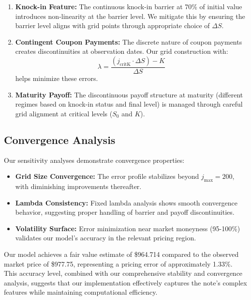 \documentclass[12pt,a4paper]{article}
\begin{document}
\begin{enumerate}
\item \textbf{Knock-in Feature:} The continuous knock-in barrier at 70\% of initial value introduces non-linearity at the barrier level. We mitigate this by ensuring the barrier level aligns with grid points through appropriate choice of \(\Delta S\).

\item \textbf{Contingent Coupon Payments:} The discrete nature of coupon payments creates discontinuities at observation dates. Our grid construction with:
\[
    \lambda = \frac{(j_{\text{critK}}\cdot \Delta S) - K}{\Delta S}
\]
helps minimize these errors.

\item \textbf{Maturity Payoff:} The discontinuous payoff structure at maturity (different regimes based on knock-in status and final level) is managed through careful grid alignment at critical levels (\(S_0\) and \(K\)).
\end{enumerate}

\subsection*{Convergence Analysis}

Our sensitivity analyses demonstrate convergence properties:

\begin{itemize}
\item \textbf{Grid Size Convergence:} The error profile stabilizes beyond \(j_{\text{max}} = 200\), with diminishing improvements thereafter.

\item \textbf{Lambda Consistency:} Fixed lambda analysis shows smooth convergence behavior, suggesting proper handling of barrier and payoff discontinuities.

\item \textbf{Volatility Surface:} Error minimization near market moneyness (95-100\%) validates our model's accuracy in the relevant pricing region.
\end{itemize}

Our model achieves a fair value estimate of \$964.714 compared to the observed market price of \$977.75, representing a pricing error of approximately 1.33\%. This accuracy level, combined with our comprehensive stability and convergence analysis, suggests that our implementation effectively captures the note's complex features while maintaining computational efficiency.
\end{document}

